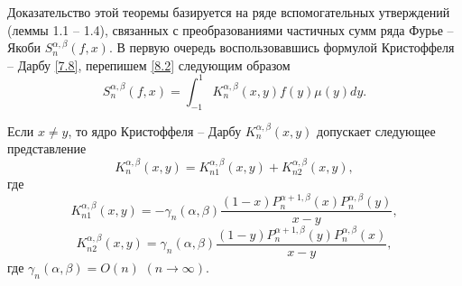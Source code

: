 Доказательство этой теоремы базируется на ряде вспомогательных утверждений (леммы 1.1 -- 1.4), связанных с преобразованиями частичных сумм ряда Фурье -- Якоби $S_n^{\alpha,\beta}(f,x)$.
В первую очередь воспользовавшись формулой   Кристоффеля -- Дарбу \eqref{7.8}, перепишем \eqref{8.2} следующим образом
\begin{equation}\label{8.3}
S_n^{\alpha,\beta}(f,x)=\int_{-1}^1K^{\alpha,\beta}_n(x,y)f(y)\mu(y)dy.
\end{equation}

\begin{lemma}\label{l1}
Если $x\neq y$, то ядро Кристоффеля -- Дарбу $K^{\alpha,\beta}_n(x,y)$ допускает следующее представление
\begin{equation}\label{8.4}
K^{\alpha,\beta}_n(x,y)=K^{\alpha,\beta}_{n1}(x,y)+K^{\alpha,\beta}_{n2}(x,y),
\end{equation}
где
\begin{equation}\label{8.5}
K^{\alpha,\beta}_{n1}(x,y)=-\gamma_n(\alpha,\beta)
\frac{(1-x)P_n^{\alpha+1,\beta}(x)P_n^{\alpha,\beta}(y)}{x-y},
\end{equation}
\begin{equation}\label{8.6}
K^{\alpha,\beta}_{n2}(x,y)=\gamma_n(\alpha,\beta)
\frac{(1-y)P_n^{\alpha+1,\beta}(y)P_n^{\alpha,\beta}(x)}{x-y},
\end{equation}
где $\gamma_n(\alpha,\beta)=O(n)$ $(n\to\infty)$.
\end{lemma}

